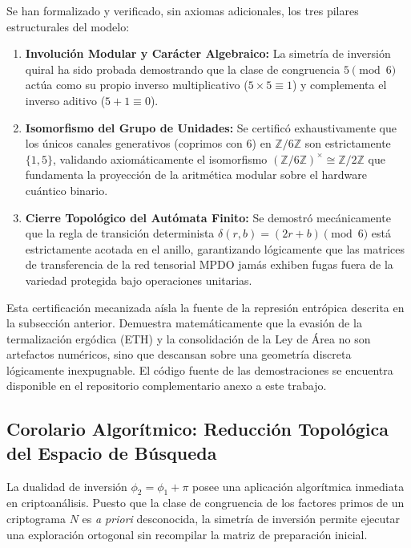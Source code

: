 \documentclass[12pt,a4paper]{article}
\theoremstyle{plain}
\theoremstyle{definition}
\theoremstyle{remark}
\begin{document}
Se han formalizado y verificado, sin axiomas adicionales, los tres pilares estructurales del modelo:
\begin{enumerate}
    \item \textbf{Involución Modular y Carácter Algebraico:} La simetría de inversión quiral ha sido probada demostrando que la clase de congruencia $5 \pmod 6$ actúa como su propio inverso multiplicativo ($5 \times 5 \equiv 1$) y complementa el inverso aditivo ($5 + 1 \equiv 0$).
    \item \textbf{Isomorfismo del Grupo de Unidades:} Se certificó exhaustivamente que los únicos canales generativos (coprimos con 6) en $\mathbb{Z}/6\mathbb{Z}$ son estrictamente $\{1, 5\}$, validando axiomáticamente el isomorfismo $(\mathbb{Z}/6\mathbb{Z})^{\times} \cong \mathbb{Z}/2\mathbb{Z}$ que fundamenta la proyección de la aritmética modular sobre el hardware cuántico binario.
    \item \textbf{Cierre Topológico del Autómata Finito:} Se demostró mecánicamente que la regla de transición determinista $\delta(r,b) = (2r+b) \pmod 6$ está estrictamente acotada en el anillo, garantizando lógicamente que las matrices de transferencia de la red tensorial MPDO jamás exhiben fugas fuera de la variedad protegida bajo operaciones unitarias.
\end{enumerate}

Esta certificación mecanizada aísla la fuente de la represión entrópica descrita en la subsección anterior. Demuestra matemáticamente que la evasión de la termalización ergódica (ETH) y la consolidación de la Ley de Área no son artefactos numéricos, sino que descansan sobre una geometría discreta lógicamente inexpugnable. El código fuente de las demostraciones se encuentra disponible en el repositorio complementario anexo a este trabajo.

\subsection{Corolario Algorítmico: Reducción Topológica del Espacio de Búsqueda}
\label{subsec:estrategia_adaptativa}

La dualidad de inversión $\phi_2 = \phi_1 + \pi$ posee una aplicación algorítmica inmediata en criptoanálisis. Puesto que la clase de congruencia de los factores primos de un criptograma $N$ es \textit{a priori} desconocida, la simetría de inversión permite ejecutar una exploración ortogonal sin recompilar la matriz de preparación inicial.
\end{document}
